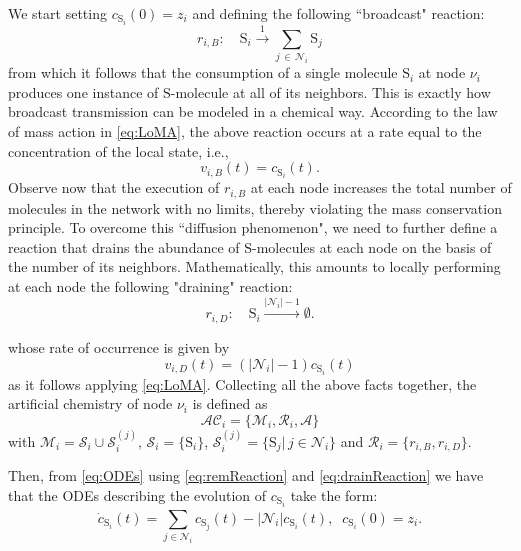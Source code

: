 \documentclass[journal]{IEEEtran}
\newcommand{\mol}[1]{\ensuremath{\textrm{#1}}}
\begin{document}
{We start setting ${c_{{\mol{S}_i}}} (0) = z_i$ and defining the following ``broadcast" reaction:}\begin{equation} \label{eq:remReaction}
	r_{i,B}:  \quad \mol{S}_{i}\stackrel{1}{\longrightarrow}  \sum_{j\, \in \, \mathcal{N}_i} \mol{S}_{j}
\end{equation}
from which it follows that the consumption of a single molecule $\mol{S}_i$ at node $\nu_i$ produces one instance of $\mol{S}$-molecule {at all of its neighbors}. This is exactly how broadcast transmission can be modeled in a chemical way. {According to the law of mass action in \eqref{eq:LoMA}, the above reaction occurs at a rate equal to the concentration of the local state, i.e.,
\begin{equation}
	v_{i,B}(t) = c_{\mol{S}_i}(t).
 \end{equation}
Observe now that the execution of $r_{i,B}$ at each node increases the total number of molecules in the network with no limits, thereby violating the mass conservation principle.} 
To overcome this {``diffusion phenomenon"}, we need to further define a reaction that drains the abundance of $\mol{S}$-molecules at each node on the basis of the number of its neighbors. Mathematically, this amounts to locally performing at each node the following {"draining"} reaction:
\begin{equation}\label{eq:drainReaction}
	r_{i,D}: \quad \mol{S}_i  \stackrel{|\mathcal{N}_i| -1}{\longrightarrow} \emptyset. 
 \end{equation}
 {whose rate of occurrence is given by  
\begin{equation}
	v_{i,D}(t) = \left(|\mathcal{N}_i|-1\right)c_{\mol{S}_i}(t)
 \end{equation}
as it follows applying \eqref{eq:LoMA}. Collecting all the above facts together, the artificial chemistry of node $\nu_i$ is { defined as 
\begin{equation}\label{200}
\mathcal{AC}_i=\{\mathcal M_i, \mathcal R_i, \mathcal A\}
\end{equation}
with $\mathcal M_i = \mathcal{S}_i \cup \mathcal{S}_i^{(j)}$, $\mathcal{S}_i = \{\mol{S}_i\}$, $\mathcal{S}_i^{(j)} = \{\mol{S}_j|\,j \in\mathcal{N}_i\}$ and $\mathcal R_i = \{r_{i,B},r_{i,D}\}$}.

}
Then, from \eqref{eq:ODEs} using \eqref{eq:remReaction} and \eqref{eq:drainReaction} we have that the ODEs describing the evolution of $c_{{\mol{S}_i}}$ take the form: 
\begin{equation}\label{eq:ODE_0}
{\dot c_{{\mol{S}_i}}} (t) =  {\sum\limits_{j \in {\mathcal{N}_i}}^{} {{c_{{\mol{S}_j}}}}(t)} -  {{|\mathcal{N}_i|}{c_{\mol{S}_i}}(t)},\;\;c_{\mol{S}_i}(0)=z_i.
\end{equation}
\end{document}
